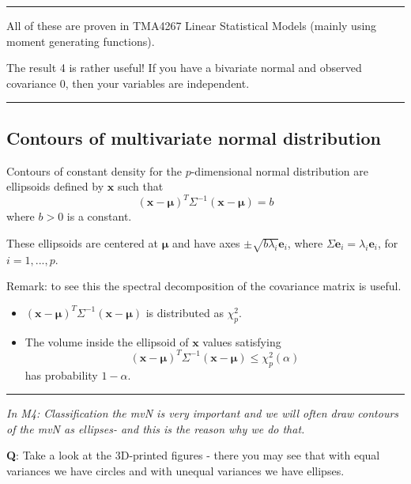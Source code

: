 \documentclass[]{article}
\providecommand{\tightlist}{%
  \setlength{\itemsep}{0pt}\setlength{\parskip}{0pt}}
\begin{document}
\begin{center}\rule{0.5\linewidth}{\linethickness}\end{center}

All of these are proven in TMA4267 Linear Statistical Models (mainly
using moment generating functions).

The result 4 is rather useful! If you have a bivariate normal and
observed covariance 0, then your variables are independent.

\begin{center}\rule{0.5\linewidth}{\linethickness}\end{center}

\hypertarget{contours-of-multivariate-normal-distribution}{%
\subsection{Contours of multivariate normal
distribution}\label{contours-of-multivariate-normal-distribution}}

Contours of constant density for the \(p\)-dimensional normal
distribution are ellipsoids defined by \(\mathbf{x}\) such that
\[ (\mathbf{x}-\mathbf{\mu})^T\Sigma^{-1}(\mathbf{x}-\mathbf{\mu})=b \]
where \(b>0\) is a constant.

These ellipsoids are centered at \(\mathbf{\mu}\) and have axes
\(\pm \sqrt{b \lambda_i}\mathbf{e}_i\), where
\(\Sigma\mathbf{e}_i=\lambda_i \mathbf{e}_i\), for \(i=1,...,p\).

Remark: to see this the spectral decomposition of the covariance matrix
is useful.

\begin{itemize}
\tightlist
\item
  \((\mathbf{x}-\mathbf{\mu})^T\Sigma^{-1}(\mathbf{x}-\mathbf{\mu})\) is
  distributed as \(\chi^2_p\).
\item
  The volume inside the ellipsoid of \(\mathbf{x}\) values satisfying
  \[ (\mathbf{x}-\mathbf{\mu})^T\Sigma^{-1}(\mathbf{x}-\mathbf{\mu}) \le \chi^2_p(\alpha) \]
  has probability \(1-\alpha\).
\end{itemize}

\begin{center}\rule{0.5\linewidth}{\linethickness}\end{center}

\emph{In M4: Classification the mvN is very important and we will often
draw contours of the mvN as ellipses- and this is the reason why we do
that. }

\textbf{Q}: Take a look at the 3D-printed figures - there you may see
that with equal variances we have circles and with unequal variances we
have ellipses.
\end{document}
